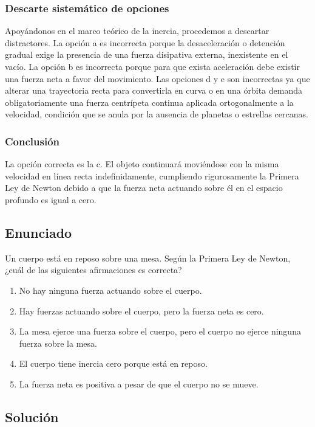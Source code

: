 \documentclass[12pt, a4paper]{article}
\begin{document}
\subsubsection*{Descarte sistemático de opciones}
Apoyándonos en el marco teórico de la inercia, procedemos a descartar distractores. La opción a es incorrecta porque la desaceleración o detención gradual exige la presencia de una fuerza disipativa externa, inexistente en el vacío. La opción b es incorrecta porque para que exista aceleración debe existir una fuerza neta a favor del movimiento. Las opciones d y e son incorrectas ya que alterar una trayectoria recta para convertirla en curva o en una órbita demanda obligatoriamente una fuerza centrípeta continua aplicada ortogonalmente a la velocidad, condición que se anula por la ausencia de planetas o estrellas cercanas.

\subsubsection*{Conclusión}
La opción correcta es la c. El objeto continuará moviéndose con la misma velocidad en línea recta indefinidamente, cumpliendo rigurosamente la Primera Ley de Newton debido a que la fuerza neta actuando sobre él en el espacio profundo es igual a cero.

\newpage

\subsection*{Enunciado}
Un cuerpo está en reposo sobre una mesa. Según la Primera Ley de Newton, ¿cuál de las siguientes afirmaciones es correcta?
\begin{enumerate}
    \item[a)] No hay ninguna fuerza actuando sobre el cuerpo.
    \item[b)] Hay fuerzas actuando sobre el cuerpo, pero la fuerza neta es cero.
    \item[c)] La mesa ejerce una fuerza sobre el cuerpo, pero el cuerpo no ejerce ninguna fuerza sobre la mesa.
    \item[d)] El cuerpo tiene inercia cero porque está en reposo.
    \item[e)] La fuerza neta es positiva a pesar de que el cuerpo no se mueve.
\end{enumerate}

\subsection*{Solución}
\end{document}
